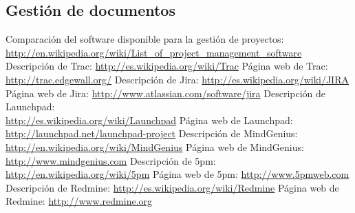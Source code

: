 \documentclass[11pt,a4paper,spanish,twoside]{report}
\begin{document}
	\subsection{Gestión de documentos}

\begin{thebibliography}{99}
 Comparación del software disponible para la gestión de proyectos:
\\ \url{http://en.wikipedia.org/wiki/List_of_project_management_software}
 Descripción de Trac:
  \url{http://es.wikipedia.org/wiki/Trac}
 Página web de Trac:
  \url{http://trac.edgewall.org/}
 Descripción de Jira:
  \url{http://es.wikipedia.org/wiki/JIRA}
 Página web de Jira:
  \url{http://www.atlassian.com/software/jira}
 Descripción de Launchpad:\\
  \url{http://es.wikipedia.org/wiki/Launchpad}
 Página web de Launchpad:\\
  \url{http://launchpad.net/launchpad-project}
 Descripción de MindGenius:\\
  \url{http://en.wikipedia.org/wiki/MindGenius}
 Página web de MindGenius:
  \url{http://www.mindgenius.com}
 Descripción de 5pm:
  \url{http://en.wikipedia.org/wiki/5pm}
 Página web de 5pm:
  \url{http://www.5pmweb.com}
 Descripción de Redmine:
  \url{http://es.wikipedia.org/wiki/Redmine}
 Página web de Redmine:
  \url{http://www.redmine.org}
\end{thebibliography}
% 
%
\end{document}
